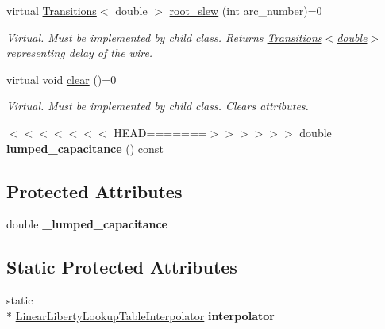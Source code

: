 \begin{DoxyCompactItemize}
virtual \hyperlink{classTransitions}{Transitions}$<$ double $>$ \hyperlink{classWireDelayModel_a9e5344c26b73f549a2b5c38fea8af13d}{root\-\_\-slew} (int arc\-\_\-number)=0
\begin{DoxyCompactList}\small\item\em Virtual. Must be implemented by child class. Returns \hyperlink{classTransitions}{Transitions$<$double$>$} representing delay of the wire. \end{DoxyCompactList}\item 
virtual void \hyperlink{classWireDelayModel_a74869a3a66deb53507e8bc6f16eff45c}{clear} ()=0
\begin{DoxyCompactList}\small\item\em Virtual. Must be implemented by child class. Clears attributes. \end{DoxyCompactList}\item 
\hypertarget{classWireDelayModel_ab9daf37e347fb28b4b40eb8f6c5674a2}{$<$$<$$<$$<$$<$$<$$<$ H\-E\-A\-D=======$>$$>$$>$$>$$>$$>$ double {\bfseries lumped\-\_\-capacitance} () const }\label{classWireDelayModel_ab9daf37e347fb28b4b40eb8f6c5674a2}

\end{DoxyCompactItemize}
\subsection*{Protected Attributes}
\begin{DoxyCompactItemize}
\item 
\hypertarget{classWireDelayModel_ab03b1640710e81c9dcd4cbe9b7fed329}{double {\bfseries \-\_\-lumped\-\_\-capacitance}}\label{classWireDelayModel_ab03b1640710e81c9dcd4cbe9b7fed329}

\end{DoxyCompactItemize}
\subsection*{Static Protected Attributes}
\begin{DoxyCompactItemize}
\item 
\hypertarget{classWireDelayModel_aa8f767316492b902c13ec68651b30247}{static \\*
\hyperlink{classLinearLibertyLookupTableInterpolator}{Linear\-Liberty\-Lookup\-Table\-Interpolator} {\bfseries interpolator}}\label{classWireDelayModel_aa8f767316492b902c13ec68651b30247}

\end{DoxyCompactItemize}



